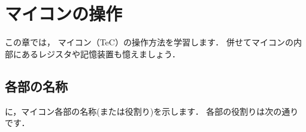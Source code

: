 \renewcommand{\myincludegraphics}[2]{\texttt{[image: chap4/\#1]}}

\chapter{マイコンの操作\label{sousa}}

この章では，
マイコン（TeC）の操作方法を学習します．
併せてマイコンの内部にあるレジスタや記憶装置も憶えましょう．

\section{各部の名称}
に，マイコン各部の名称(または役割り)を示します．
各部の役割りは次の通りです．


